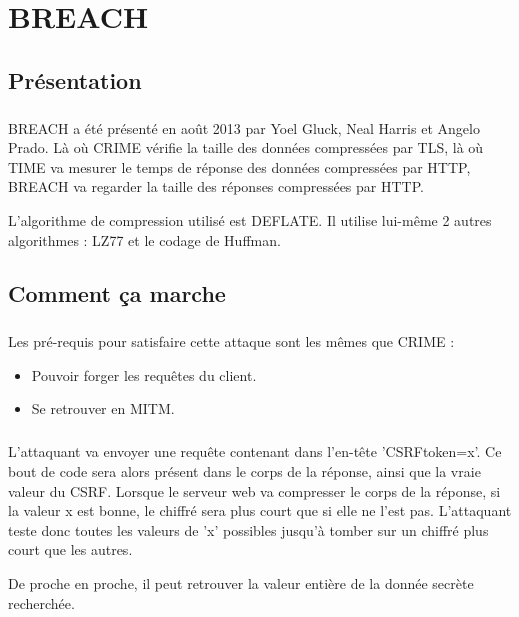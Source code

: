 \chapter{BREACH}
\label{chap:breach}

\section{Présentation}
\paragraph{}
BREACH a été présenté en août 2013 par Yoel Gluck, Neal Harris et Angelo Prado. Là où CRIME vérifie la taille des données compressées par TLS, là où TIME va mesurer le temps de réponse des données compressées par HTTP, BREACH va regarder la taille des réponses compressées par HTTP.

L'algorithme de compression utilisé est DEFLATE. Il utilise lui-même 2 autres algorithmes : LZ77 et le codage de Huffman.

\section{Comment ça marche}
\paragraph{}
Les pré-requis pour satisfaire cette attaque sont les mêmes que CRIME :
\begin{itemize}
  \item Pouvoir forger les requêtes du client.
  \item Se retrouver en MITM.
\end{itemize}

\paragraph{}
L'attaquant va envoyer une requête contenant dans l'en-tête 'CSRFtoken=x'. Ce bout de code sera alors présent dans le corps de la réponse, ainsi que la vraie valeur du CSRF. Lorsque le serveur web va compresser le corps de la réponse, si la valeur x est bonne, le chiffré sera plus court que si elle ne l'est pas. L'attaquant teste donc toutes les valeurs de 'x' possibles jusqu'à tomber sur un chiffré plus court que les autres.

De proche en proche, il peut retrouver la valeur entière de la donnée secrète recherchée.\\

